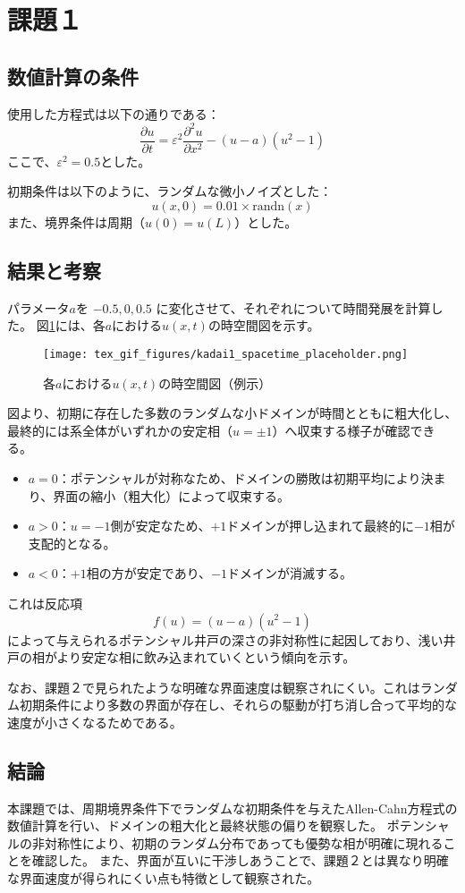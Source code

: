 
\section{課題１}
\subsection{数値計算の条件}
使用した方程式は以下の通りである：
\[
\frac{\partial u}{\partial t} = \varepsilon^2 \frac{\partial^2 u}{\partial x^2} - (u-a)(u^2 - 1)
\]
ここで、$\varepsilon^2 = 0.5$とした。

初期条件は以下のように、ランダムな微小ノイズとした：
\[
u(x, 0) = 0.01 \times \text{randn}(x)
\]
また、境界条件は周期（$u(0) = u(L)$）とした。

\subsection{結果と考察}
パラメータ$a$を $-0.5, 0, 0.5$ に変化させて、それぞれについて時間発展を計算した。
図\ref{fig:random_ic_evolution}には、各$a$における$u(x,t)$の時空間図を示す。

\begin{figure}[H]
  \centering
  \texttt{[image: tex\_gif\_figures/kadai1\_spacetime\_placeholder.png]}
  \caption{各$a$における$u(x,t)$の時空間図（例示）}
  \label{fig:random_ic_evolution}
\end{figure}

図より、初期に存在した多数のランダムな小ドメインが時間とともに粗大化し、最終的には系全体がいずれかの安定相（$u = \pm 1$）へ収束する様子が確認できる。

\begin{itemize}
  \item $a = 0$：ポテンシャルが対称なため、ドメインの勝敗は初期平均により決まり、界面の縮小（粗大化）によって収束する。
  \item $a > 0$：$u = -1$側が安定なため、$+1$ドメインが押し込まれて最終的に$-1$相が支配的となる。
  \item $a < 0$：$+1$相の方が安定であり、$-1$ドメインが消滅する。
\end{itemize}

これは反応項
\[
f(u) = (u - a)(u^2 - 1)
\]
によって与えられるポテンシャル井戸の深さの非対称性に起因しており、浅い井戸の相がより安定な相に飲み込まれていくという傾向を示す。

なお、課題２で見られたような明確な界面速度は観察されにくい。これはランダム初期条件により多数の界面が存在し、それらの駆動が打ち消し合って平均的な速度が小さくなるためである。

\subsection{結論}
本課題では、周期境界条件下でランダムな初期条件を与えたAllen-Cahn方程式の数値計算を行い、ドメインの粗大化と最終状態の偏りを観察した。
ポテンシャルの非対称性により、初期のランダム分布であっても優勢な相が明確に現れることを確認した。
また、界面が互いに干渉しあうことで、課題２とは異なり明確な界面速度が得られにくい点も特徴として観察された。
